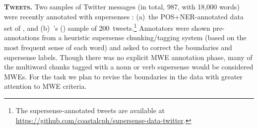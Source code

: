\documentclass[11pt]{article}
\newcommand{\citeposs}[1]{\citeauthor{#1}'s (\citeyear{#1})}
\newcommand{\ensuretext}[1]{#1}
\newcommand{\nssmarker}{\ensuretext{\textcolor{magenta}{\ensuremath{^{\textsc{NS}}_{\textsc{S}}}}}}
\newcommand{\arkcomment}[3]{\ensuretext{\textcolor{#3}{[#1 #2]}}}
\newcommand{\nss}[1]{\arkcomment{\nssmarker}{#1}{magenta}}
\newcommand{\longversion}[1]{#1} %
\begin{document}
\textbf{\textsc{Tweets}.} Two samples of Twitter messages (in total, 987, with 18,000 words) 
were recently annotated with supersenses \citep{johannsen-14}\longversion{: 
(a)~the POS+NER-annotated data set of \citet{Ritter:ea:11}, 
and %
(b)~\citeposs{Plank:ea:14} sample of 200~tweets}.\footnote{The supersense-annotated tweets 
are available at \url{https://github.com/coastalcph/supersense-data-twitter}.}
Annotators were shown pre-annotations from a heuristic supersense chunking\slash tagging system%
\longversion{ (based on the most frequent sense of each word)}
and asked to correct the boundaries and supersense labels. 
Though there was no explicit MWE annotation phase, 
many of the multiword chunks tagged with a \longversion{noun or verb }supersense would be considered MWEs. 
For the task we plan to revise the boundaries in the data with greater attention to MWE criteria.
\end{document}
